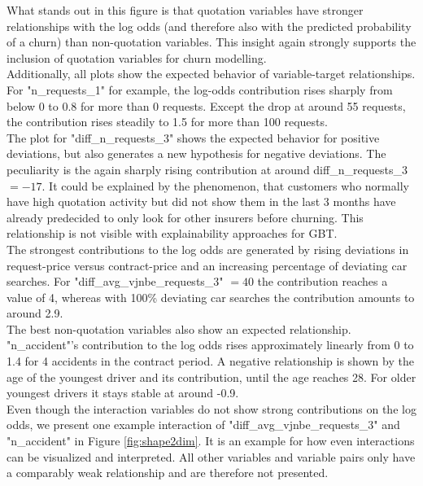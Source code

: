 \documentclass[12pt,titlepage]{article}
\begin{document}
What stands out in this figure is that quotation variables have stronger relationships with the log odds (and therefore also with the predicted probability of a churn) than non-quotation variables. This insight again strongly supports the inclusion of quotation variables for churn modelling. \\
Additionally, all plots show the expected behavior of variable-target relationships. For "n\_requests\_1" for example, the log-odds contribution rises sharply from below 0 to 0.8 for more than 0 requests. Except the drop at around 55 requests, the contribution rises steadily to 1.5 for more than 100 requests. \\
The plot for "diff\_n\_requests\_3" shows the expected behavior for positive deviations, but also generates a new hypothesis for negative deviations. The peculiarity is the again sharply rising contribution at around diff\_n\_requests\_3 $=-17$. It could be explained by the phenomenon, that customers who normally have high quotation activity but did not show them in the last 3 months have already predecided to only look for other insurers before churning. This relationship is not visible with explainability approaches for GBT. \\
The strongest contributions to the log odds are generated by rising deviations in request-price versus contract-price and an increasing percentage of deviating car searches. For "diff\_avg\_vjnbe\_requests\_3" $=40$ the contribution reaches a value of 4, whereas with 100\% deviating car searches the contribution amounts to around 2.9. \\
The best non-quotation variables also show an expected relationship. "n\_accident"'s contribution to the log odds rises approximately linearly from 0 to 1.4 for 4 accidents in the contract period. A negative relationship is shown by the age of the youngest driver and its contribution, until the age reaches 28. For older youngest drivers it stays stable at around -0.9. \\
Even though the interaction variables do not show strong contributions on the log odds, we present one example interaction of "diff\_avg\_vjnbe\_requests\_3" and "n\_accident" in Figure \ref{fig:shape2dim}. It is an example for how even interactions can be visualized and interpreted. All other variables and variable pairs only have a comparably weak relationship and are therefore not presented. \\
\end{document}
